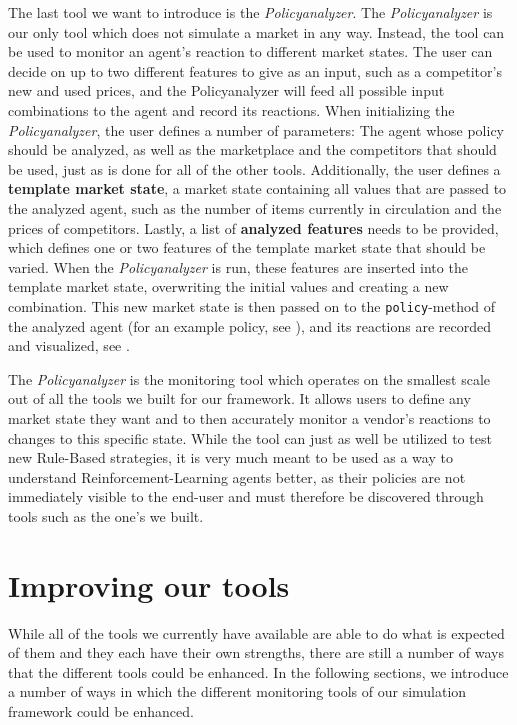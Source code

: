 The last tool we want to introduce is the \emph{Policyanalyzer}. The \emph{Policyanalyzer} is our only tool which does not simulate a market in any way. Instead, the tool can be used to monitor an agent's reaction to different market states. The user can decide on up to two different features to give as an input, such as a competitor's new and used prices, and the Policyanalyzer will feed all possible input combinations to the agent and record its reactions. When initializing the \emph{Policyanalyzer}, the user defines a number of parameters: The agent whose policy should be analyzed, as well as the marketplace and the competitors that should be used, just as is done for all of the other tools. Additionally, the user defines a \textbf{template market state}, a market state containing all values that are passed to the analyzed agent, such as the number of items currently in circulation and the prices of competitors. Lastly, a list of \textbf{analyzed features} needs to be provided, which defines one or two features of the template market state that should be varied. When the \emph{Policyanalyzer} is run, these features are inserted into the template market state, overwriting the initial values and creating a new combination. This new market state is then passed on to the \texttt{policy}-method of the analyzed agent (for an example policy, see ), and its reactions are recorded and visualized, see .

The \emph{Policyanalyzer} is the monitoring tool which operates on the smallest scale out of all the tools we built for our framework. It allows users to define any market state they want and to then accurately monitor a vendor's reactions to changes to this specific state. While the tool can just as well be utilized to test new Rule-Based strategies, it is very much meant to be used as a way to understand Reinforcement-Learning agents better, as their policies are not immediately visible to the end-user and must therefore be discovered through tools such as the one's we built.

\section{Improving our tools}

While all of the tools we currently have available are able to do what is expected of them and they each have their own strengths, there are still a number of ways that the different tools could be enhanced. In the following sections, we introduce a number of ways in which the different monitoring tools of our simulation framework could be enhanced.

